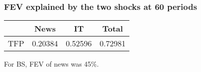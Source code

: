 \documentclass{beamer}
\begin{document}
\begin{frame}
	\frametitle{FEV explained by the two shocks at 60 periods}


    \hspace{2.25cm}
\begin{large}
	\begin{tabular}{lccc}
	\hline
		& News & IT & Total \\
		\hline
	TFP	           & 0.20384  & 0.52596 & 0.72981  \\
		\hline
	\end{tabular}
\end{large}

\vspace{2cm}

For BS, FEV of news was 45\%.
		 	
\end{frame}
\end{document}
